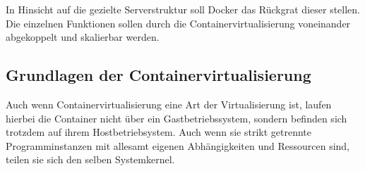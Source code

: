\documentclass[12pt,a4paper]{scrartcl}
\begin{document}
In Hinsicht auf die gezielte Serverstruktur soll Docker das Rückgrat dieser stellen. Die einzelnen Funktionen sollen durch die Containervirtualisierung voneinander abgekoppelt und skalierbar werden.

\subsection{Grundlagen der Containervirtualisierung}

Auch wenn Containervirtualisierung eine Art der Virtualisierung ist, laufen hierbei die Container nicht über ein Gastbetriebssystem, sondern befinden sich trotzdem auf ihrem Hostbetriebsystem. Auch wenn sie strikt getrennte Programminstanzen mit allesamt eigenen Abhängigkeiten und Ressourcen sind, teilen sie sich den selben Systemkernel. 
\end{document}

